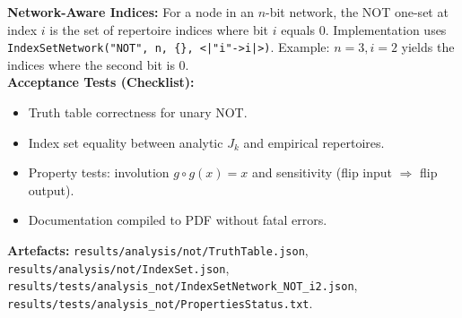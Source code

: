\documentclass{article}
\begin{document}
\textbf{Network-Aware Indices:} For a node in an \(n\)-bit network, the NOT one-set at index \(i\) is the set of repertoire indices where bit \(i\) equals 0. Implementation uses \texttt{IndexSetNetwork("NOT", n, \{\}, \texttt{<|"i"->i|>})}. Example: \(n=3, i=2\) yields the indices where the second bit is 0.\\
\textbf{Acceptance Tests (Checklist):}
\begin{itemize}
 \item Truth table correctness for unary NOT.
 \item Index set equality between analytic \(J_k\) and empirical repertoires.
 \item Property tests: involution \(g\circ g(x)=x\) and sensitivity (flip input \(\Rightarrow\) flip output).
 \item Documentation compiled to PDF without fatal errors.
\end{itemize}
\textbf{Artefacts:} \texttt{results/analysis/not/TruthTable.json}, \texttt{results/analysis/not/IndexSet.json}, \texttt{results/tests/analysis\_not/IndexSetNetwork\_NOT\_i2.json}, \texttt{results/tests/analysis\_not/PropertiesStatus.txt}.
\end{document}
